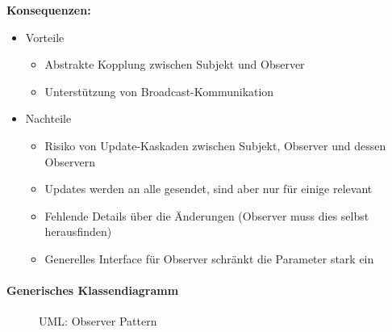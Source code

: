 \documentclass[a4paper, 11pt, accentcolor = tud3b]{tudreport}
\begin{document}
					\textbf{Konsequenzen:}
					\begin{itemize}
						\item Vorteile
							\begin{itemize}
								\item Abstrakte Kopplung zwischen Subjekt und Observer
								\item Unterstützung von Broadcast-Kommunikation
							\end{itemize}
						\item Nachteile
							\begin{itemize}
								\item Risiko von Update-Kaskaden zwischen Subjekt, Observer und dessen Observern
								\item Updates werden an alle gesendet, sind aber nur für einige relevant
								\item Fehlende Details über die Änderungen (Observer muss dies selbst herausfinden)
								\item Generelles Interface für Observer schränkt die Parameter stark ein
							\end{itemize}
					\end{itemize}
				
				\paragraph{Generisches Klassendiagramm}
					\begin{figure}[ht]
						\centering
						\caption{UML: Observer Pattern}
					\end{figure}
				
\end{document}
